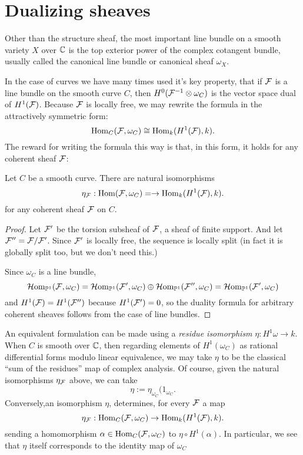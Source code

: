 \section {Dualizing sheaves} 

\def\HH{{H}}

Other than  the structure sheaf, the most important line bundle on a smooth variety   $X$ over $\CC$ is the top exterior power of the complex cotangent bundle, usually called the canonical line bundle or canonical sheaf $\omega_{X}$. 

In the case of curves  we have many times used it's key property, that if  $\cF$  is a line bundle on the smooth curve  $C$, then $\HH^{0}(\sF^{-1}\otimes \omega_{C})$ is the vector space dual of $\HH^{1}(\cF)$. Because $\sF$ is locally free, we may rewrite the formula in the attractively symmetric form:
$$
\Hom_{C}(\sF, \omega_{C})
\cong 
\Hom_{k}(\HH^{1}(\cF), k).
$$
The reward for writing the formula this way is that, in this form, 
it holds for any coherent sheaf $\cF$:

\begin{proposition} Let $C$ be a smooth curve.
There are natural isomorphisms
$$
\eta_{\sF}: \Hom(\sF,\omega_{C}) =  
\to 
\Hom_{k}(\HH^{1}(\cF), k).
$$
for any coherent sheaf $\cF$ on $C$.
\end{proposition}

\begin{proof}
 Let $\cF'$ be the torsion subsheaf  of $\cF$, a sheaf of finite support. And let
 $\cF'' = \cF/\cF'$.
 Since
$\cF'$ is locally free, the sequence is locally split (in fact it is globally split too, but we don't need this.)

Since $\omega_{C}$ is a line bundle, 
$$
\sHom_{\PP^1}(\sF, \omega_{C}) = 
\sHom_{\PP^1}(\sF', \omega_{C}) \oplus \sHom_{\PP^1}(\sF'', \omega_{C})  = 
\sHom_{\PP^1}(\sF', \omega_{C}) 
$$
and 
$\HH^{1}(\cF) = \HH^{1}(\cF'')
$
because $\HH^{1}(\cF') = 0$, so the duality formula for arbitrary coherent sheaves follows from the case of line bundles.
\end{proof}

An equivalent formulation can be made using a \emph{residue isomorphism} $\eta: H^{1}\omega \to k$. When $C$ is smooth over $\CC$, then regarding elements of 
$\HH^{1}(\omega_{C})$ as rational differential forms modulo linear equivalence,
we may take $\eta$ to be the classical ``sum of the residues'' map of complex analysis.
Of course, given the natural isomorphisms $\eta_{\sF}$ above, we can take
$$
\eta := \eta_{\omega_{C}}(1_{\omega_{C}}.
$$ Conversely,an isomorphism $\eta$, 
determines, for every $\sF$ a map
$$
\eta_{\sF}:\Hom_{C}(\sF, \omega_{C})
\to
\Hom_{k}(\HH^{1}(\cF), k).
$$
sending a homomorphism
$\alpha \in \Hom_{C}(\sF, \omega_{C}) $
to $\eta \circ \HH^{1}(\alpha)$. In particular, we see that $\eta$ itself corresponds to the 
identity map of $\omega_{C}$  

